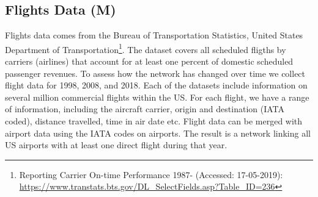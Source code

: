 
\subsection{Flights Data (M)}
\label{subsec:Flight_Data}
Flights data comes from the Bureau of Transportation Statistics, United States Department of Transportation\footnote{Reporting Carrier On-time Performance 1987- (Accessed: 17-05-2019):\\ \url{https://www.transtats.bts.gov/DL_SelectFields.asp?Table_ID=236}}. The dataset covers all scheduled fligths by carriers (airlines) that account for at least one percent of domestic scheduled passenger revenues. To assess how the network has changed over time we collect flight data for 1998, 2008, and 2018. Each of the datasets include information on several million commercial flights within the US. For each flight, we have a range of information, including the aircraft carrier, origin and destination (IATA coded), distance travelled, time in air date etc. Flight data can be merged with airport data using the IATA codes on airports. The result is a network linking all US airports with at least one direct flight during that year.

